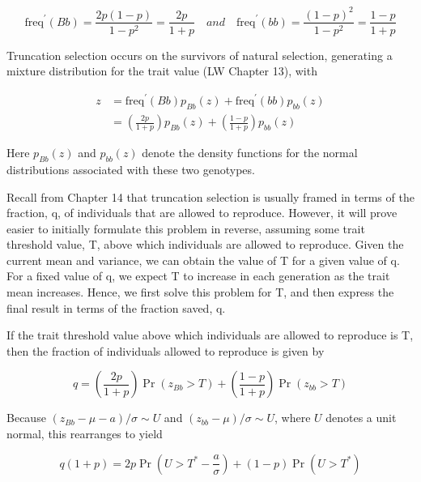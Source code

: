 \documentclass{article}
\begin{document}
\begin{equation}
\mathrm{freq}^{\prime}(Bb)=\frac{2p(1-p)}{1-p^{2}}=\frac{2p}{1+p}\quad and\quad\mathrm{freq}^{\prime}(bb)=\frac{(1-p)^{2}}{1-p^{2}}=\frac{1-p}{1+p}
\end{equation}

Truncation selection occurs on the survivors of natural selection, generating a mixture distribution for the trait value (LW Chapter 13), with

\begin{equation}
\begin{aligned}z&=\mathrm{freq}^{\prime}(Bb)p_{Bb}(z)+\mathrm{freq}^{\prime}(bb)p_{bb}(z)\\&=\left(\frac{2p}{1+p}\right)p_{Bb}(z)+\left(\frac{1-p}{1+p}\right)p_{bb}(z)\end{aligned}
\end{equation}

Here  $ p_{Bb}(z) $ and  $ p_{bb}(z) $ denote the density functions for the normal distributions associated with these two genotypes.

Recall from Chapter 14 that truncation selection is usually framed in terms of the fraction, q, of individuals that are allowed to reproduce. However, it will prove easier to initially formulate this problem in reverse, assuming some trait threshold value, T, above which individuals are allowed to reproduce. Given the current mean and variance, we can obtain the value of T for a given value of q. For a fixed value of q, we expect T to increase in each generation as the trait mean increases. Hence, we first solve this problem for T, and then express the final result in terms of the fraction saved, q.

If the trait threshold value above which individuals are allowed to reproduce is T, then the fraction of individuals allowed to reproduce is given by

\begin{equation}
q=\left(\frac{2p}{1+p}\right)\Pr(z_{Bb}>T)+\left(\frac{1-p}{1+p}\right)\Pr(z_{bb}>T)
\end{equation}

Because  $ (z_{Bb} - \mu - a)/\sigma \sim U $ and  $ (z_{bb} - \mu)/\sigma \sim U $, where  $ U $ denotes a unit normal, this rearranges to yield

\begin{equation}
q(1+p)=2p\Pr\left(U>T^{*}-\frac{a}{\sigma}\right)+(1-p)\Pr(U>T^{*})
\tag{25.13}
\label{eq:25_13}
\end{equation}
\end{document}
